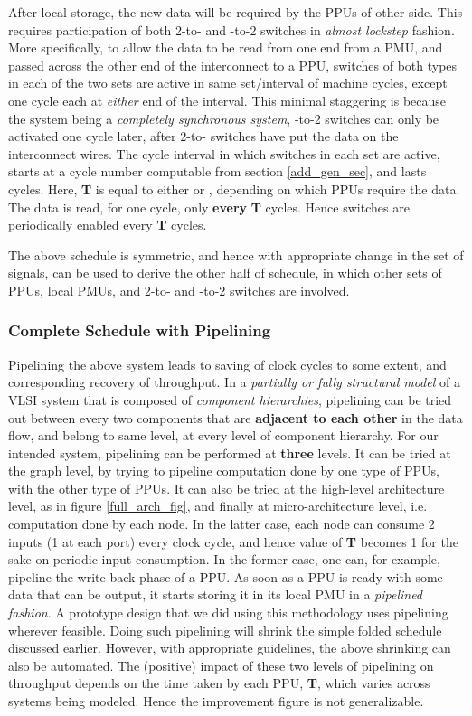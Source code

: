 \documentclass[12pt]{article}
\begin{document}
After local storage, the new data will be required by the PPUs
of other side. This requires participation of both 2-to- and
-to-2 switches in \textit{almost lockstep} fashion.
More specifically, to allow the data to be read from one
end from a PMU, and passed across the other end of the
interconnect to a PPU, switches of both types in each
of the two sets are active in same set/interval of machine cycles, except one
cycle each at \textit{either} end of the interval. This minimal staggering
is because the system being a \textit{completely
synchronous system}, -to-2 switches can only be activated one cycle
later, after 2-to- switches have put the data on the interconnect
wires. The cycle interval in which switches in each set are
active, starts at a cycle number computable
from section \ref{add_gen_sec}, and lasts {\large } cycles. Here, \textbf{T} is equal to either
 or , depending on which PPUs require the data. The
data is read, for one cycle, only \textbf{every} \textbf{T}
cycles. Hence switches are \uline{periodically enabled} every
\textbf{T} cycles.

The above schedule is symmetric, and hence with appropriate change in the
set of signals, can be used to derive the other half of
schedule, in
which other sets of PPUs, local PMUs, and
2-to- and -to-2 switches are involved.

\subsubsection{Complete Schedule with Pipelining}
\label{pipeline_sec}

Pipelining the above system leads to saving of clock cycles to some
extent, and corresponding recovery of throughput. In a
\textit{partially or fully structural model} of a VLSI
system that is composed of \textit{component hierarchies}, pipelining can
be tried out between every two components that are \textbf{adjacent to each
other} in the data flow, and belong to same level, at every level of
component hierarchy. For our intended system, pipelining
can be performed at \textbf{three}
levels. It can be tried at the graph level, by trying to
pipeline computation done by one type of PPUs, with the other
type of PPUs. It can also be tried at the
high-level architecture level, as in figure
\ref{full_arch_fig}, and finally at micro-architecture level,
i.e. computation done by each node. In the latter case, each node can
consume 2 inputs (1 at each port) every clock cycle, and hence value of
\textbf{T} becomes 1 for the sake on periodic input consumption.
In the former case, one can, for example, pipeline
the write-back phase of a PPU. As soon as a PPU is
ready with some data that can be output, it starts storing it in its local
PMU in a \textit{pipelined fashion}. A prototype design that we did
using this methodology uses pipelining wherever feasible. Doing such
pipelining will shrink the simple folded schedule discussed earlier.
However, with appropriate guidelines, the above shrinking can also be
automated. The (positive) impact of these two levels of pipelining
on throughput depends on the time taken by each PPU,
\textbf{T}, which varies across systems being modeled. Hence the
improvement figure is not generalizable.
\end{document}
